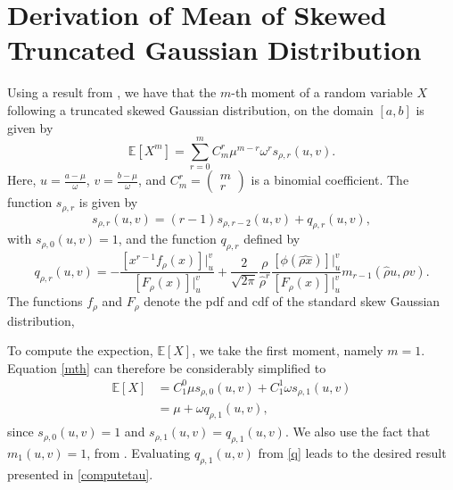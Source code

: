 \section{Derivation of Mean of Skewed Truncated Gaussian Distribution}

Using a result from \cite{skewed}, we have that the $m$-th moment of a random variable $X$ following a truncated skewed Gaussian distribution, on the domain $[a,b]$ is given by
\begin{equation}\label{mth}
\mathbb{E}[X^m]=\sum_{r=0}^mC_m^r\mu^{m-r}\omega^rs_{\rho,r}(u,v).
\end{equation}
Here, $u=\frac{a-\mu}{\omega}$, $v=\frac{b-\mu}{\omega}$, and $C_m^r=\begin{pmatrix}m\\r\end{pmatrix}$ is a binomial coefficient. The function $s_{\rho,r}$ is given by
\begin{equation}\label{s}
    s_{\rho,r}(u,v)=(r-1)s_{\rho,r-2}(u,v)+q_{\rho,r}(u,v),
\end{equation}
with $s_{\rho,0}(u,v)=1$, and the function $q_{\rho,r}$ defined by
\begin{equation}\label{q}
    q_{\rho,r}(u,v)=-\frac{\left[x^{r-1}f_\rho(x)\right]|_u^v}{\left[F_\rho(x)\right]|_u^v}+\frac{2}{\sqrt{2\pi}}\frac{\rho}{\hat{\rho}^r}\frac{\left[\phi(\hat{\rho x})\right]|_u^v}{\left[F_\rho(x)\right]|_u^v}m_{r-1}(\hat{\rho}u, \hat{\rho}v).
\end{equation}
The functions $f_\rho$ and $F_\rho$ denote the pdf and cdf of the standard skew Gaussian distribution,

 To compute the expection, $\mathbb{E}[X]$, we take the first moment, namely $m=1$. Equation \eqref{mth} can therefore be considerably simplified to
\begin{equation}
    \begin{split}
\mathbb{E}[X]&=C_1^0\mu s_{\rho,0}(u,v)+C_1^1\omega s_{\rho,1}(u,v)\\
&=\mu+\omega q_{\rho,1}(u,v),
\end{split}
\end{equation}
since $s_{\rho,0}(u,v)=1$ and $s_{\rho,1}(u,v)=q_{\rho,1}(u,v)$. We also use the fact that $m_1(u,v)=1$, from \cite{skewed}. Evaluating $q_{\rho,1}(u,v)$ from \eqref{q} leads to the desired result presented in \eqref{computetau}.
